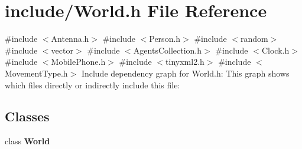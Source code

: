 \section{include/\+World.h File Reference}
\label{_world_8h}
{\ttfamily \#include $<$Antenna.\+h$>$}\newline
{\ttfamily \#include $<$Person.\+h$>$}\newline
{\ttfamily \#include $<$random$>$}\newline
{\ttfamily \#include $<$vector$>$}\newline
{\ttfamily \#include $<$Agents\+Collection.\+h$>$}\newline
{\ttfamily \#include $<$Clock.\+h$>$}\newline
{\ttfamily \#include $<$Mobile\+Phone.\+h$>$}\newline
{\ttfamily \#include $<$tinyxml2.\+h$>$}\newline
{\ttfamily \#include $<$Movement\+Type.\+h$>$}\newline
Include dependency graph for World.\+h\+:
This graph shows which files directly or indirectly include this file\+:
\subsection*{Classes}
\begin{DoxyCompactItemize}
\item 
class \textbf{ World}
\end{DoxyCompactItemize}
